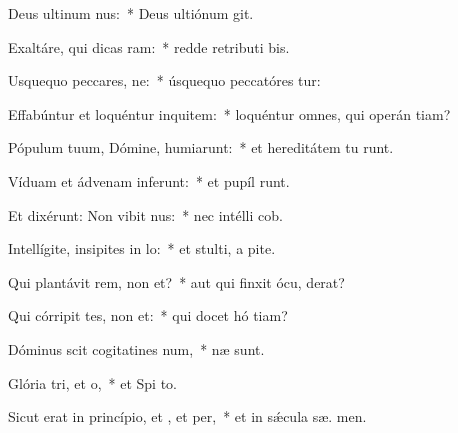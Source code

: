 \item Deus ultinum nus:~* Deus ultiónum  git.
\item Exaltáre, qui dicas ram:~* redde retributi bis.
\item Usquequo peccares, ne:~* úsquequo peccatóres tur:
\item Effabúntur et loquéntur inquitem:~* loquéntur omnes, qui operán tiam?
\item Pópulum tuum, Dómine, humiarunt:~* et hereditátem tu runt.
\item Víduam et ádvenam inferunt:~* et pupíl runt.
\item Et dixérunt: Non vibit nus:~* nec intélli  cob.
\item Intellígite, insipites in lo:~* et stulti, a pite.
\item Qui plantávit rem, non et?~* aut qui finxit ócu,  derat?
\item Qui córripit tes, non et:~* qui docet hó tiam?
\item Dóminus scit cogitatines num,~*  næ sunt.
\item Glória tri, et o,~* et Spi to.
\item Sicut erat in princípio, et , et per,~* et in sǽcula sæ. men.
